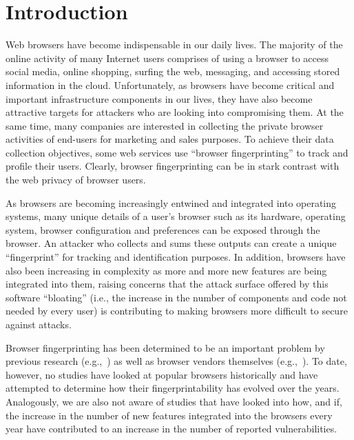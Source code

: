 \section{Introduction}
\label{sec:introduction}

Web browsers have become indispensable in our daily lives. The
majority of the online activity of many Internet users comprises of
using a browser to access social media, online shopping, surfing the
web, messaging, and accessing stored information in the cloud.
Unfortunately, as browsers have become critical and important
infrastructure components in our lives, they have also become
attractive targets for attackers who are looking into compromising
them. At the same time, many companies are interested in collecting
the private browser activities of end-users for marketing and sales
purposes. To achieve their data collection objectives, some web
services use ``browser fingerprinting'' to track and profile their
users. Clearly, browser fingerprinting can be in stark contrast with
the web privacy of browser users.

As browsers are becoming increasingly entwined and integrated into
operating systems, many unique details of a user's browser such as its
hardware, operating system, browser configuration and preferences can be
exposed through the browser. An attacker who collects and sums these
outputs can create a unique ``fingerprint'' for tracking and
identification purposes. In addition, browsers have also been
increasing in complexity as more and more new features are being
integrated into them, raising concerns that the attack surface offered
by this software ``bloating'' (i.e., the increase in the number of
components and code not needed by every user) is contributing to
making browsers more difficult to secure against attacks.

Browser fingerprinting has been determined to be an important problem
by previous research (e.g.,~\cite{cookiemonster-SP13,panopticlick,mowery2012pixel,fpdetective}) as well as browser vendors
themselves (e.g.,~\cite{safari-privacy, brave-fpbudget, firefox-fingerprinting}). To date, however, no studies have looked
at popular browsers historically and have attempted to determine how
their fingerprintability has evolved over the years. Analogously, we
are also not aware of studies that have looked into how, and if, the
increase in the number of new features integrated into the browsers
every year have contributed to an increase in the number of reported
vulnerabilities.

